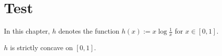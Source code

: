 \chapter{Test}

In this chapter, $h$ denotes the function $h(x) := x \log \frac{1}{x}$ for $x \in [0,1]$.

\begin{lemma}[Concavity]\label{concave}
  $h$ is strictly concave on $[0,1]$.
\end{lemma}
